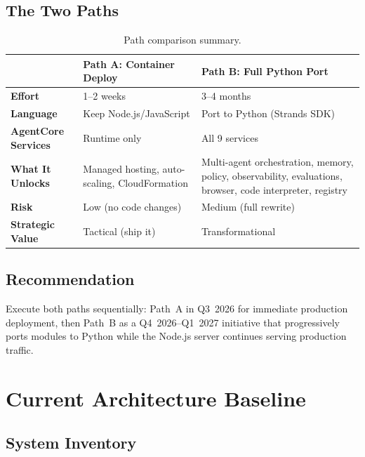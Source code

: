 \documentclass[11pt,letterpaper]{article}
\begin{document}
\subsection{The Two Paths}

\begin{table}[H]
\centering
\footnotesize
\begin{tabular}{@{}p{3cm}p{5.5cm}p{5.5cm}@{}}
\toprule
& \textbf{Path A: Container Deploy} & \textbf{Path B: Full Python Port} \\
\midrule
\textbf{Effort} & 1--2 weeks & 3--4 months \\
\textbf{Language} & Keep Node.js/JavaScript & Port to Python (Strands SDK) \\
\textbf{AgentCore Services} & Runtime only & All 9 services \\
\textbf{What It Unlocks} & Managed hosting, auto-scaling, CloudFormation & Multi-agent orchestration, memory, policy, observability, evaluations, browser, code interpreter, registry \\
\textbf{Risk} & Low (no code changes) & Medium (full rewrite) \\
\textbf{Strategic Value} & Tactical (ship it) & Transformational \\
\bottomrule
\end{tabular}
\caption{Path comparison summary.}
\end{table}

\subsection{Recommendation}

Execute both paths sequentially: Path~A in Q3~2026 for immediate
production deployment, then Path~B as a Q4~2026--Q1~2027 initiative
that progressively ports modules to Python while the Node.js server
continues serving production traffic.

\section{Current Architecture Baseline}

\subsection{System Inventory}
\end{document}
